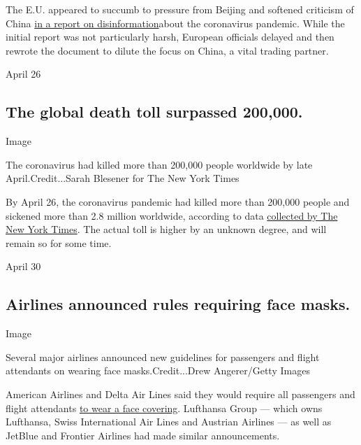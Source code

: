 The E.U. appeared to succumb to pressure from Beijing and softened
criticism of China
\href{https://www.nytimes3xbfgragh.onion/2020/04/24/world/europe/disinformation-china-eu-coronavirus.html?action=click\&module=RelatedLinks\&pgtype=Article}{in
a report on disinformation}about the coronavirus pandemic. While the
initial report was not particularly harsh, European officials delayed
and then rewrote the document to dilute the focus on China, a vital
trading partner.

April 26

\hypertarget{the-global-death-toll-surpassed-200000}{%
\subsection{The global death toll surpassed
200,000.}\label{the-global-death-toll-surpassed-200000}}

Image

The coronavirus had killed more than 200,000 people worldwide by late
April.Credit...Sarah Blesener for The New York Times

By April 26, the coronavirus pandemic had killed more than 200,000
people and sickened more than 2.8 million worldwide, according to data
\href{https://www.nytimes3xbfgragh.onion/interactive/2020/world/coronavirus-maps.html}{collected
by The New York Times}. The actual toll is higher by an unknown degree,
and will remain so for some time.

April 30

\hypertarget{airlines-announced-rules-requiring-face-masks}{%
\subsection{Airlines announced rules requiring face
masks.}\label{airlines-announced-rules-requiring-face-masks}}

Image

Several major airlines announced new guidelines for passengers and
flight attendants on wearing face masks.Credit...Drew Angerer/Getty
Images

American Airlines and Delta Air Lines said they would require all
passengers and flight attendants
\href{https://www.nytimes3xbfgragh.onion/2020/04/30/business/airlines-masks-coronavirus-passengers.html?action=click\&module=RelatedLinks\&pgtype=Article}{to
wear a face covering}. Lufthansa Group --- which owns Lufthansa, Swiss
International Air Lines and Austrian Airlines --- as well as JetBlue and
Frontier Airlines had made similar announcements.

